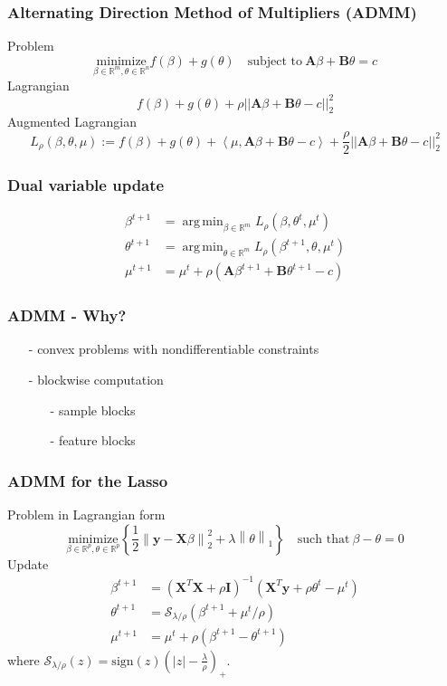 \documentclass{beamer}
\newcommand{\R}{\mathbb{R}}
\newcommand{\Norm}[1]{\left\lVert#1\right\rVert}
\newcommand{\norm}[1]{\left\lvert#1\right\rvert}
\DeclareMathOperator*{\argmin}{arg\,min}
\begin{document}
\begin{frame}
\frametitle{Alternating Direction Method of Multipliers (ADMM)}
Problem 
\[\underset{\beta\in\R^m, \theta\in\R^n}{\text{minimize}}f(\beta)+g(\theta)\quad\text{subject to}\ \mathbf{A}\beta+\mathbf{B}\theta=c\]
Lagrangian 
\[f(\beta)+g(\theta)+\rho||\mathbf{A}\beta+\mathbf{B}\theta-c||_2^2\]
Augmented Lagrangian
\[L_{\rho}(\beta,\theta,\mu):=f(\beta)+g(\theta)+\left\langle\mu,\mathbf{A}\beta+\mathbf{B}\theta-c\right\rangle+\frac{\rho}{2}||\mathbf{A}\beta+\mathbf{B}\theta-c||_2^2\]
\end{frame}


\begin{frame}
\frametitle{Dual variable update}
\begin{align*}
\beta^{t+1}&=\argmin_{\beta\in\R^m}L_{\rho}(\beta,\theta^t,\mu^t)\\
\theta^{t+1}&=\argmin_{\theta\in\R^m}L_{\rho}(\beta^{t+1},\theta,\mu^t)\\
\mu^{t+1}&=\mu^t+\rho(\mathbf{A}\beta^{t+1}+\mathbf{B}\theta^{t+1}-c)
\end{align*}
\end{frame}

\begin{frame}
\frametitle{ADMM - Why?}
\begin{itemize}
\item[-] convex problems with nondifferentiable constraints
\item[-] blockwise computation
	\begin{itemize}
	\item[-] sample blocks
	\item[-] feature blocks
	\end{itemize}
\end{itemize}
\end{frame}


\begin{frame}
\frametitle{ADMM for the Lasso}
Problem in Lagrangian form
\[\underset{\beta\in\R^p,\theta\in\R^p}{\text{minimize}}\left\{\frac{1}{2}\Norm{\mathbf{y}-\mathbf{X}\beta}_2^2+\lambda\Norm{\theta}_1\right\}\quad \text{such that}\ \beta-\theta=0 \]
Update
\begin{align*}
\beta^{t+1}&=(\mathbf{X}^T\mathbf{X}+\rho\mathbf{I})^{-1}(\mathbf{X}^T\mathbf{y}+\rho\theta^t-\mu^t)\\
\theta^{t+1}&=\mathcal{S}_{\lambda/\rho}(\beta^{t+1}+\mu^t/\rho)\\
\mu^{t+1}&=\mu^t+\rho(\beta^{t+1}-\theta^{t+1})
\end{align*}
where $\mathcal{S}_{\lambda/\rho}(z)=\text{sign}(z)(\norm{z}-\frac{\lambda}{\rho})_+$.
\end{frame}
\end{document}
